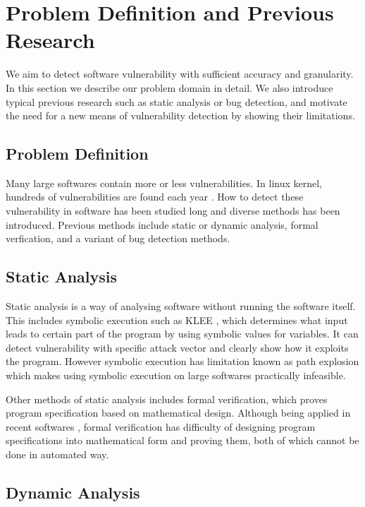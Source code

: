 \section{Problem Definition and Previous Research}
We aim to detect software vulnerability with sufficient accuracy and granularity.
In this section we describe our problem domain in detail.
We also introduce typical previous research such as static analysis or bug detection,
and motivate the need for a new means of vulnerability detection by showing their limitations.


\subsection{Problem Definition}

Many large softwares contain more or less vulnerabilities. In linux kernel, hundreds of vulnerabilities are found each year \cite{cvelinux}.
How to detect these vulnerability in software has been studied long and diverse methods has been introduced.
Previous methods include static or dynamic analysis, formal verfication, and a variant of bug detection methods.

\subsection{Static Analysis}

Static analysis is a way of analysing software without running the software itself.
This includes symbolic execution such as KLEE \cite{cadar2008klee}, which determines what input leads to certain part of the program by using symbolic values for variables.
It can detect vulnerability with specific attack vector and clearly show how it exploits the program.
However symbolic execution has limitation known as path explosion which makes using symbolic execution on large softwares practically infeasible.

Other methods of static analysis includes formal verification, which proves program specification based on mathematical design.
Although being applied in recent softwares \cite{rustbelt}, formal verification has difficulty of designing program specifications into mathematical form and proving them, both of which cannot be done in automated way.

\subsection{Dynamic Analysis}

